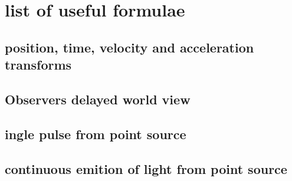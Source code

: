 \chapter{list of useful formulae}\label{ch: list of useful formulae}

\section{position, time, velocity and acceleration transforms}\label{sect: position, time and velocity transforms}

\section{Observers delayed world view}\label{sect: Observers delayed world view}

\section{ingle pulse from point source}\label{sect: ingle pulse from point source}

\section{continuous emition of light from point source}\label{sect: continuous emition of light from point source}